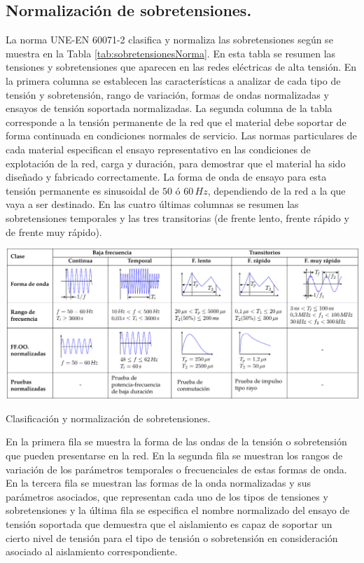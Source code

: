         \subsection{Normalización de sobretensiones.}
            La norma UNE-EN 60071-2 clasifica y normaliza las sobretensiones según se muestra en la Tabla \ref{tab:sobretensionesNorma}. En esta tabla se resumen las tensiones y sobretensiones que aparecen en las redes eléctricas de alta tensión. En la primera columna se establecen las características a analizar de cada tipo de tensión y sobretensión, rango de variación, formas de ondas normalizadas y ensayos de tensión soportada normalizadas. La segunda columna de la tabla corresponde a la tensión permanente de la red que el material debe soportar de forma continuada en condiciones normales de servicio. Las normas particulares de cada material especifican el ensayo representativo en las condiciones de explotación de la red, carga y duración, para demostrar que el material ha sido diseñado y fabricado correctamente. La forma de onda de ensayo para esta tensión permanente es sinusoidal de $50$ ó $60\,\textit{Hz}$, dependiendo de la red a la que vaya a ser destinado. En las cuatro últimas columnas se resumen las sobretensiones temporales y las tres transitorias (de frente lento, frente rápido y de frente muy rápido).\newline

            {\noindent\centering\includegraphics[scale=0.7]{capitulos/tema1/sobretensionesNorma/sobretensionesNorma.pdf}}
            \begin{table}[H]
                \caption{Clasificación y normalización de sobretensiones.}
                \label{tab:sobretensionesNorma}
            \end{table}

            \vspace{-0.5cm}
            En la primera fila se muestra la forma de las ondas de la tensión o sobretensión que pueden presentarse en la red. En la segunda fila se muestran los rangos de variación de los parámetros temporales o frecuenciales de estas formas de onda. En la tercera fila se muestran las formas de la onda normalizadas y sus parámetros asociados, que representan cada uno de los tipos de tensiones y sobretensiones y la última fila se especifica el nombre normalizado del ensayo de tensión soportada que demuestra que el aislamiento es capaz de soportar un cierto nivel de tensión para el tipo de tensión o sobretensión en consideración asociado al aislamiento correspondiente.\newline

